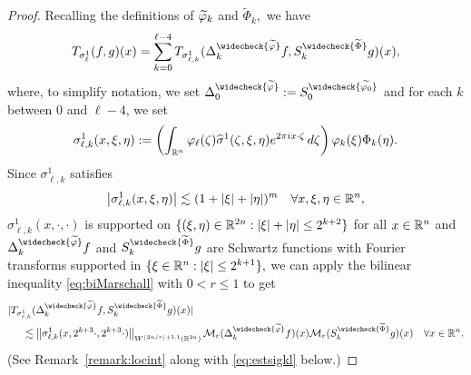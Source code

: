 \begin{proof}
Recalling the definitions of $\widetilde{\varphi}_k$ and $\widetilde{\Phi}_k,$  we have
\begin{align*}
T_{\sigma^1_\ell}(f,g)(x) = 
  \sum\limits_{k=0}^{\ell -4} T_{\sigma^1_{\ell,k}}(\Delta^{\widecheck{\widetilde{\f}}}_k f,S^{\widecheck{\widetilde{\Phi}}}_k g)(x),
\end{align*}
where, to simplify notation, we set $\Delta^{\widecheck{\widetilde{\f}}}_0 :=S^{\widecheck{\widetilde{\f_0}}}_0$ and for each $k$ between $0$ and $\ell -4$, we set 
$$
\sigma^1_{\ell, k}(x, \xi, \eta):=\left( \int_{{{\mathbb R}^n}}  \varphi_\ell(\zeta) \widehat{\sigma}^1(\zeta, \xi, \eta) e^{2\pi i x \cdot \zeta}  \, d\zeta \right)  \varphi_k(\xi) \Phi_k(\eta).
$$ 
Since $\sigma^1_{\ell,k}$ satisfies 
$$\left\vert \sigma^1_{\ell,k}(x,\xi,\eta) \right\vert\lesssim (1+\left\vert \xi \right\vert+\left\vert \eta \right\vert)^m\quad \forall x,\xi,\eta\in{{\mathbb R}^n},$$
$\sigma^1_{\ell, k}(x,\cdot,\cdot)$ is supported on $\{(\xi, \eta) \in \mathbb{R}^{2n} : |\xi| + |\eta| \leq 2^{k+2}\}$ for all $x\in{{\mathbb R}^n}$ and $\Delta^{\widecheck{\widetilde{\f}}}_k f$ and $S^{\widecheck{\widetilde{\Phi}}}_k g$ are Schwartz functions with  Fourier transforms  supported in $\{\xi \in {{\mathbb R}^n}: |\xi| \le 2^{k+1}\},$  we can apply the bilinear inequality \eqref{eq:biMarschall} with $0<r\le 1$ to get 
\begin{align}\label{eq:bound:h1:ell:k}
&|T_{\sigma^1_{\ell,k}}(\Delta^{\widecheck{\widetilde{\f}}}_k f,
S^{\widecheck{\widetilde{\Phi}}}_k g)(x)| \\
&\hspace{0.5cm}\lesssim  \norm{\sigma^1_{\ell, k}(x, 2^{k+3} \cdot, 2^{k+3} \cdot)}{W^{\lfloor{2n/r}\rfloor + 1,1}(\re^{2n})} \mathcal{M}_r(\Delta^{\widecheck{\widetilde{\f}}}_k f)(x)\mathcal{M}_r(
S^{\widecheck{\widetilde{\Phi}}}_k g)(x)\quad \forall x\in\rn.\nonumber
\end{align}
(See Remark~\ref{remark:locint} along with \eqref{eq:estsigkl} below.)


\end{proof}

